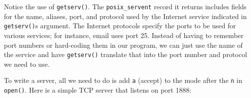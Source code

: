 
Notice the use of \texttt{getserv()}. The
\texttt{posix\_servent} record it returns includes fields for the name,
aliases, port, and protocol used by the Internet service indicated in
\texttt{getserv()}{\textquotesingle}s argument. The Internet protocols
specify the ports to be used for various services; for instance, email
uses port 25. Instead of having to remember port numbers or hard-coding
them in our program, we can just use the name of the service and have
\texttt{getserv()} translate that into the port number and protocol we
need to use.

To write a server, all we need to do is add
\texttt{{\textquotedbl}a{\textquotedbl}} (accept) to the mode after the
\texttt{{\textquotedbl}n{\textquotedbl}} in \texttt{open()}. Here is a
simple TCP server that listens on port 1888:


